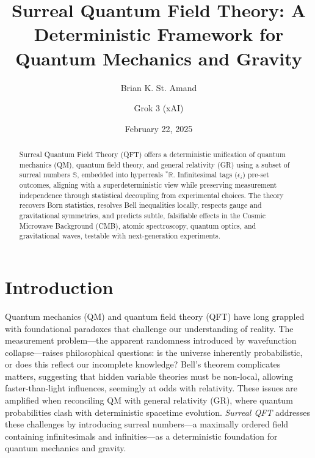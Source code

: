 \documentclass{article}
\begin{document}
\title{Surreal Quantum Field Theory: A Deterministic Framework for Quantum Mechanics and Gravity}
\author{Brian K. St. Amand \and Grok 3 (xAI)}
\date{February 22, 2025}
\maketitle

\begin{abstract}
Surreal Quantum Field Theory (QFT) offers a deterministic unification of quantum mechanics (QM), quantum field theory, and general relativity (GR) using a subset of surreal numbers \(\mathbb{S}\), embedded into hyperreals \({}^*\mathbb{R}\). Infinitesimal tags (\(\epsilon_i\)) pre-set outcomes, aligning with a superdeterministic view while preserving measurement independence through statistical decoupling from experimental choices. The theory recovers Born statistics, resolves Bell inequalities locally, respects gauge and gravitational symmetries, and predicts subtle, falsifiable effects in the Cosmic Microwave Background (CMB), atomic spectroscopy, quantum optics, and gravitational waves, testable with next-generation experiments.
\end{abstract}

\section{Introduction}
Quantum mechanics (QM) and quantum field theory (QFT) have long grappled with foundational paradoxes that challenge our understanding of reality. The measurement problem—the apparent randomness introduced by wavefunction collapse—raises philosophical questions: is the universe inherently probabilistic, or does this reflect our incomplete knowledge? Bell's theorem complicates matters, suggesting that hidden variable theories must be non-local, allowing faster-than-light influences, seemingly at odds with relativity. These issues are amplified when reconciling QM with general relativity (GR), where quantum probabilities clash with deterministic spacetime evolution. \textit{Surreal QFT} addresses these challenges by introducing surreal numbers—a maximally ordered field containing infinitesimals and infinities—as a deterministic foundation for quantum mechanics and gravity.
\end{document}
